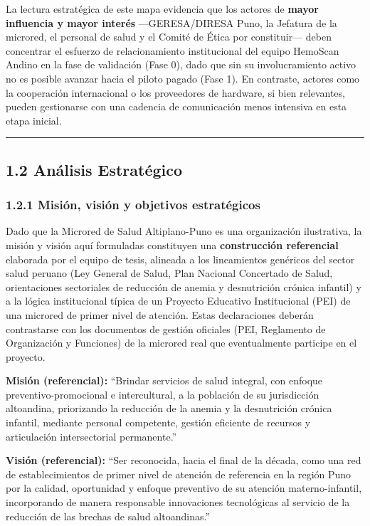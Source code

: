 \documentclass[11pt,a4paper]{article}
\begin{document}
La lectura estratégica de este mapa evidencia que los actores de \textbf{mayor influencia y mayor interés} ---GERESA/DIRESA Puno, la Jefatura de la microred, el personal de salud y el Comité de Ética por constituir--- deben concentrar el esfuerzo de relacionamiento institucional del equipo HemoScan Andino en la fase de validación (Fase 0), dado que sin su involucramiento activo no es posible avanzar hacia el piloto pagado (Fase 1). En contraste, actores como la cooperación internacional o los proveedores de hardware, si bien relevantes, pueden gestionarse con una cadencia de comunicación menos intensiva en esta etapa inicial.

\begin{center}\rule{0.5\linewidth}{0.5pt}\end{center}

\subsection{1.2 Análisis Estratégico}\label{anuxe1lisis-estratuxe9gico}

\subsubsection{1.2.1 Misión, visión y objetivos estratégicos}\label{misiuxf3n-visiuxf3n-y-objetivos-estratuxe9gicos}

Dado que la Microred de Salud Altiplano-Puno es una organización ilustrativa, la misión y visión aquí formuladas constituyen una \textbf{construcción referencial} elaborada por el equipo de tesis, alineada a los lineamientos genéricos del sector salud peruano (Ley General de Salud, Plan Nacional Concertado de Salud, orientaciones sectoriales de reducción de anemia y desnutrición crónica infantil) y a la lógica institucional típica de un Proyecto Educativo Institucional (PEI) de una microred de primer nivel de atención. Estas declaraciones deberán contrastarse con los documentos de gestión oficiales (PEI, Reglamento de Organización y Funciones) de la microred real que eventualmente participe en el proyecto.

\textbf{Misión (referencial):} ``Brindar servicios de salud integral, con enfoque preventivo-promocional e intercultural, a la población de su jurisdicción altoandina, priorizando la reducción de la anemia y la desnutrición crónica infantil, mediante personal competente, gestión eficiente de recursos y articulación intersectorial permanente.''

\textbf{Visión (referencial):} ``Ser reconocida, hacia el final de la década, como una red de establecimientos de primer nivel de atención de referencia en la región Puno por la calidad, oportunidad y enfoque preventivo de su atención materno-infantil, incorporando de manera responsable innovaciones tecnológicas al servicio de la reducción de las brechas de salud altoandinas.''
\end{document}
